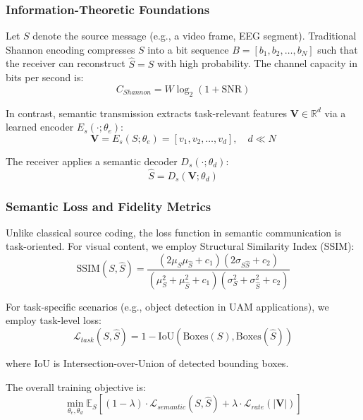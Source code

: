 \documentclass{BVP_CINC}
\begin{document}
\subsubsection{Information-Theoretic Foundations}
Let $S$ denote the source message (e.g., a video frame, EEG segment). Traditional Shannon encoding compresses $S$ into a bit sequence $B = [b_1, b_2, \ldots, b_N]$ such that the receiver can reconstruct $\hat{S} = S$ with high probability. The channel capacity in bits per second is:
\begin{equation}
    C_{Shannon} = W \log_2(1 + \text{SNR})
\end{equation}

In contrast, semantic transmission extracts task-relevant features $\mathbf{V} \in \mathbb{R}^d$ via a learned encoder $E_s(\cdot; \theta_e)$:
\begin{equation}
    \mathbf{V} = E_s(S; \theta_e) = [v_1, v_2, \ldots, v_d], \quad d \ll N
\end{equation}

The receiver applies a semantic decoder $D_s(\cdot; \theta_d)$:
\begin{equation}
    \hat{S} = D_s(\mathbf{V}; \theta_d)
\end{equation}

\subsubsection{Semantic Loss and Fidelity Metrics}
Unlike classical source coding, the loss function in semantic communication is task-oriented. For visual content, we employ Structural Similarity Index (SSIM):
\begin{equation}
    \text{SSIM}(S, \hat{S}) = \frac{(2\mu_S\mu_{\hat{S}} + c_1)(2\sigma_{S\hat{S}} + c_2)}{(\mu_S^2 + \mu_{\hat{S}}^2 + c_1)(\sigma_S^2 + \sigma_{\hat{S}}^2 + c_2)}
\end{equation}

For task-specific scenarios (e.g., object detection in UAM applications), we employ task-level loss:
\begin{equation}
    \mathcal{L}_{task}(S, \hat{S}) = 1 - \text{IoU}(\text{Boxes}(S), \text{Boxes}(\hat{S}))
\end{equation}

where IoU is Intersection-over-Union of detected bounding boxes.

The overall training objective is:
\begin{equation}
    \min_{\theta_e, \theta_d} \mathbb{E}_S \left[ (1-\lambda) \cdot \mathcal{L}_{semantic}(S, \hat{S}) + \lambda \cdot \mathcal{L}_{rate}(|\mathbf{V}|) \right]
\end{equation}
\end{document}
